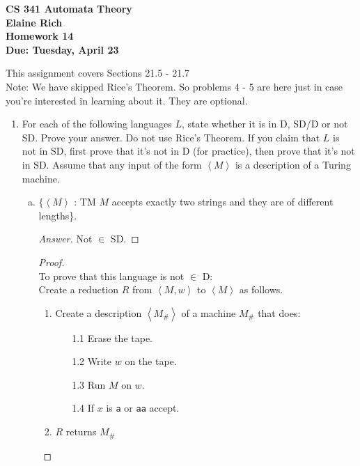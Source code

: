 \documentclass[10pt]{article}
\newcommand{\brackets}[1]{\left< #1 \right>}
\begin{document}
\begin{center}
\textbf{
CS 341 Automata Theory \\
Elaine Rich \\
Homework 14 \\
Due: Tuesday, April 23}\\
\end{center}

\noindent
This assignment covers Sections 21.5 - 21.7\\

\noindent
Note: We have skipped Rice's Theorem. So problems 4 - 5 are here just in case you're interested in learning about it. They are optional.

\begin{enumerate}[1)]


\item
For each of the following languages $L$, state whether it is in D, SD/D or not SD. Prove your answer. Do not use Rice's Theorem. If you claim that $L$ is not in SD, first prove that it's not in D (for practice), then prove that it's not in SD. Assume that any input of the form $\brackets{M}$ is a description of a Turing machine.
\begin{enumerate}[a)]

\item
$\{\brackets{M}$ : TM $M$ accepts exactly two strings and they are of different lengths\}.
\begin{proof}[Answer]
Not $\in$ SD.
\end{proof}
\begin{proof}[Proof]$ $\\
To prove that this language is not $\in$ D:\\
Create a reduction $R$ from $\brackets{M, w}$ to $\brackets{M}$ as follows.
\begin{enumerate}[1.]
\item
Create a description $\brackets{M_\#}$ of a machine $M_\#$ that does:
\begin{enumerate}
\item[1.1]
Erase the tape.

\item[1.2]
Write $w$ on the tape.

\item[1.3]
Run $M$ on $w$.

\item[1.4]
If $x$ is \texttt{a} or \texttt{aa} accept.
\end{enumerate}
\item
$R$ returns $M_\#$\\
\end{enumerate}


\end{proof}
\end{enumerate}
\end{enumerate}
\end{document}
